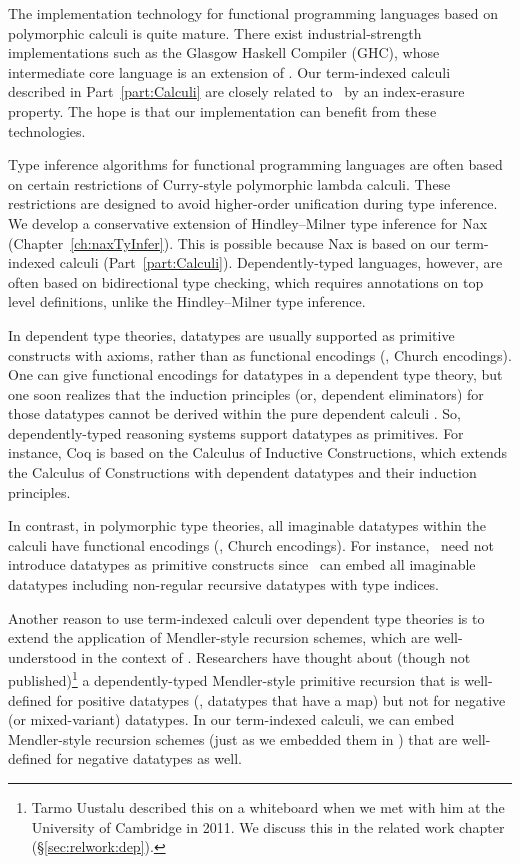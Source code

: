 The implementation technology for functional programming languages based on
polymorphic calculi is quite mature. There exist industrial-strength
implementations such as the Glasgow Haskell Compiler (GHC),
whose intermediate core language is an extension of \Fw.
Our term-indexed calculi described in Part~\ref{part:Calculi} are closely
related to \Fw\ by an index-erasure property. The hope is that
our implementation can benefit from these technologies.

Type inference algorithms for functional programming languages are often
based on certain restrictions of Curry-style polymorphic lambda calculi.
These restrictions are designed to avoid higher-order unification during
type inference. We develop a conservative extension of Hindley--Milner
type inference for Nax (Chapter~\ref{ch:naxTyInfer}). This is possible
because Nax is based on our term-indexed calculi (Part~\ref{part:Calculi}).
Dependently-typed languages, however, are often based on
bidirectional type checking, which requires annotations on top level
definitions, unlike the Hindley--Milner type inference.

In dependent type theories, datatypes are usually supported as primitive
constructs with axioms, rather than as functional encodings
(\eg, Church encodings). One can give functional encodings for datatypes
in a dependent type theory, but one soon realizes that the induction principles
(or, dependent eliminators) for those datatypes cannot be derived within
the pure dependent calculi \cite{Geuvers01}.
So, dependently-typed reasoning systems support datatypes as primitives.
For instance, Coq is based on the Calculus of Inductive Constructions, which
extends the Calculus of Constructions \cite{CoqHue86} with dependent datatypes
and their induction principles.

In contrast, in polymorphic type theories, all imaginable datatypes
within the calculi have functional encodings (\eg, Church encodings).
For instance, \Fw\ need not introduce datatypes as primitive constructs
since \Fw\ can embed all imaginable datatypes including non-regular
recursive datatypes with type indices. 

Another reason to use term-indexed calculi over dependent type theories
is to extend the application of Mendler-style recursion schemes,
which are well-understood in the context of \Fw.
Researchers have thought about (though not published)\footnote{
     Tarmo Uustalu described this on a whiteboard
     when we met with him at the University of Cambridge in 2011.
     We discuss this in the related work chapter (\S\ref{sec:relwork:dep}).}
a dependently-typed Mendler-style primitive recursion that is well-defined
for positive datatypes (\ie, datatypes that have a map) but not for
negative (or mixed-variant) datatypes. In our term-indexed calculi,
we can embed Mendler-style recursion schemes (just as we embedded them in \Fw)
that are well-defined for negative datatypes as well.

